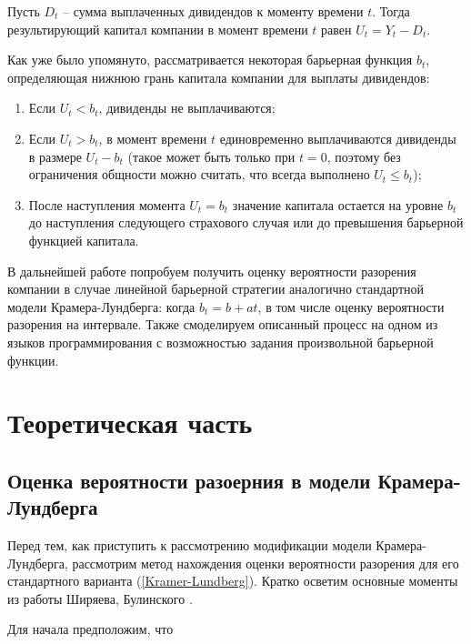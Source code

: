 \documentclass{article}
\theoremstyle{plain}
\theoremstyle{plain}
\theoremstyle{plain}
\theoremstyle{plain}
\theoremstyle{definition}
\theoremstyle{remark}
\begin{document}
Пусть $D_t$ -- сумма выплаченных дивидендов к моменту времени $t$. Тогда результирующий капитал компании в момент времени $t$ равен $U_t = Y_t - D_t$.

Как уже было упомянуто, рассматривается некоторая барьерная функция $b_t$, определяющая нижнюю грань капитала компании для выплаты дивидендов:

\begin{enumerate}
    \item Если $U_t < b_t$, дивиденды не выплачиваются;
    \item Если $U_t > b_t$, в момент времени $t$ единовременно выплачиваются дивиденды в размере $U_t - b_t$ (такое может быть только при $t = 0$, поэтому без ограничения общности можно считать, что всегда выполнено $U_t \leq b_t$);
    \item После наступления момента $U_t = b_t$ значение капитала остается на уровне $b_t$ до наступления следующего страхового случая или до превышения барьерной функцией капитала.
\end{enumerate}

В дальнейшей работе попробуем получить оценку вероятности разорения компании в случае линейной барьерной стратегии аналогично стандартной модели Крамера-Лундберга: когда $b_t = b + at$, в том числе оценку вероятности разорения на интервале. Также смоделируем описанный процесс на одном из языков программирования с возможностью задания произвольной барьерной функции.

\section{Теоретическая часть}

\subsection{Оценка вероятности разоерния в модели Крамера-Лундберга}
\label{KL_Shiryaev_section}

Перед тем, как приступить к рассмотрению модификации модели Крамера-Лундберга, рассмотрим метод нахождения оценки вероятности разорения для его стандартного варианта (\ref{Kramer-Lundberg}). Кратко осветим основные моменты из работы Ширяева, Булинского \cite{Shiryaev_stochastic}.

Для начала предположим, что
\end{document}
